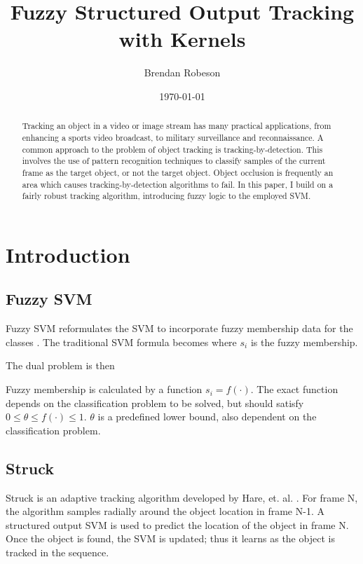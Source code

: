 \documentclass{IEEEtran}
\begin{document}
\title{Fuzzy Structured Output Tracking with Kernels}
\author{Brendan Robeson}
\date{\today}
\maketitle

\begin{abstract} %
    Tracking an object in a video or image stream has many practical applications, from enhancing a
    sports video broadcast, to military surveillance and reconnaissance. A common approach to the
    problem of object tracking is tracking-by-detection. This involves the use of pattern
    recognition techniques to classify samples of the current frame as the target object, or not the
    target object. Object occlusion is frequently an area which causes tracking-by-detection
    algorithms to fail. In this paper, I build on a fairly robust tracking algorithm, introducing
    fuzzy logic to the employed SVM.
\end{abstract}

\section{Introduction} %
\subsection{Fuzzy SVM} %
Fuzzy SVM reformulates the SVM to incorporate fuzzy membership data for the classes \cite{991432}. The
traditional SVM formula
\svmEquation
becomes
\fuzzySvmEquation
where \(s_i\) is the fuzzy membership.

The dual problem is then
\fuzzyDual

Fuzzy membership is calculated by a function \(s_i = f(\cdot)\). The exact function depends on the
classification problem to be solved, but should satisfy \(0 \le \theta \le f(\cdot) \le 1\).
\(\theta\) is a predefined lower bound, also dependent on the classification problem.

\subsection{Struck} %
Struck is an adaptive tracking algorithm developed by Hare, et. al. \cite{6126251}. For frame N, the
algorithm samples radially around the object location in frame N-1. A structured output SVM is used
to predict the location of the object in frame N. Once the object is found, the SVM is updated; thus
it learns as the object is tracked in the sequence.
\end{document}
